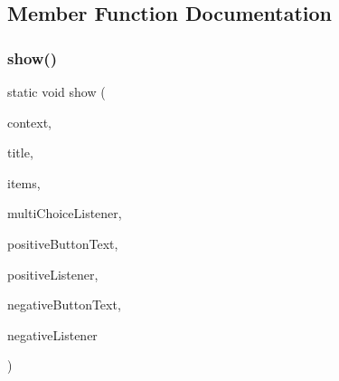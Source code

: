 \subsection{Member Function Documentation}
\mbox{\label{classcom_1_1toast_1_1android_1_1gamebase_1_1base_1_1ui_1_1_simple_multi_choice_dialog_ace87d54d3c2e079150be0c80e4ad5f4f}} 
\subsubsection{\texorpdfstring{show()}{show()}\hspace{0.1cm}{\footnotesize\ttfamily [1/3]}}
{\footnotesize\ttfamily static void show (\begin{DoxyParamCaption}\item[{@Non\+Null final Context}]{context,  }\item[{@Non\+Null final String}]{title,  }\item[{@Non\+Null final List$<$ String $>$}]{items,  }\item[{@Nullable final Dialog\+Interface.\+On\+Multi\+Choice\+Click\+Listener}]{multi\+Choice\+Listener,  }\item[{@Nullable final String}]{positive\+Button\+Text,  }\item[{@Nullable final Dialog\+Interface.\+On\+Click\+Listener}]{positive\+Listener,  }\item[{@Nullable final String}]{negative\+Button\+Text,  }\item[{@Nullable final Dialog\+Interface.\+On\+Click\+Listener}]{negative\+Listener }\end{DoxyParamCaption})\hspace{0.3cm}{\ttfamily [static]}}

